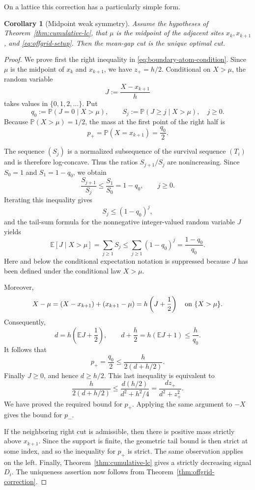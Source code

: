 \documentclass[a4paper]{amsart}
\numberwithin{equation}{section}
\newtheorem{corollary}[theorem]{Corollary}
\theoremstyle{remark}
\newcommand{\E}{\mathbb E}
\newcommand{\Pp}{\mathbb P}
\newcommand{\1}{\mathbf 1}
\begin{document}
On a lattice this correction has a particularly simple form.

\begin{corollary}[Midpoint weak symmetry]\label{cor:midpoint-symmetry}
Assume the hypotheses of Theorem~\ref{thm:cumulative-lc}, that $\mu$ is the
midpoint of the adjacent sites $x_k,x_{k+1}$, and
\eqref{eq:offgrid-setup}.  Then the mean-gap cut is the unique optimal cut.
\end{corollary}

\begin{proof}
We prove first the right inequality in
\eqref{eq:boundary-atom-condition}.  Since $\mu$ is the midpoint of
$x_k$ and $x_{k+1}$, we have $z_+=h/2$.  Conditional on $X>\mu$, the random
variable
\[
 J:=\frac{X-x_{k+1}}{h}
\]
takes values in $\{0,1,2,\ldots\}$.  Put
\[
 q_0:=\Pp(J=0\mid X>\mu),
 \qquad S_j:=\Pp(J\geq j\mid X>\mu),\quad j\geq0.
\]
Because $\Pp(X>\mu)=1/2$, the mass at the first point of the right half is
\[
 p_+=\Pp(X=x_{k+1})=\frac{q_0}{2}.
\]

The sequence $(S_j)$ is a normalized subsequence of the survival sequence
$(T_i)$ and is therefore log-concave.  Thus the ratios
$S_{j+1}/S_j$ are nonincreasing.  Since $S_0=1$ and
$S_1=1-q_0$, we obtain
\[
 \frac{S_{j+1}}{S_j}\leq\frac{S_1}{S_0}=1-q_0,
 \qquad j\geq0.
\]
Iterating this inequality gives
\[
 S_j\leq(1-q_0)^j,
\]
and the tail-sum formula for the nonnegative integer-valued random variable
$J$ yields
\[
 \E[J\mid X>\mu]=\sum_{j\geq1}S_j
 \leq\sum_{j\geq1}(1-q_0)^j
 =\frac{1-q_0}{q_0}.
\]
Here and below the conditional expectation notation is suppressed because
$J$ has been defined under the conditional law $X>\mu$.

Moreover,
\[
 X-\mu=(X-x_{k+1})+(x_{k+1}-\mu)
       =h\left(J+\frac12\right)
 \quad\hbox{on }\{X>\mu\}.
\]
Consequently,
\[
 d=h\left(\E J+\frac12\right),
 \qquad
 d+\frac h2=h(\E J+1)\leq\frac{h}{q_0}.
\]
It follows that
\[
 p_+=\frac{q_0}{2}
 \leq\frac{h}{2(d+h/2)}.
\]
Finally $J\geq0$, and hence $d\geq h/2$.  This last inequality is equivalent
to
\[
 \frac{h}{2(d+h/2)}
 \leq\frac{d(h/2)}{d^2+h^2/4}
 =\frac{dz_+}{d^2+z_+^2}.
\]
We have proved the required bound for $p_+$.  Applying the same argument to
$-X$ gives the bound for $p_-$.

If the neighboring right cut is admissible, then there is positive mass
strictly above $x_{k+1}$.  Since the support is finite, the geometric tail
bound is then strict at some index, and so the inequality for $p_+$ is strict.
The same observation applies on the left.  Finally,
Theorem~\ref{thm:cumulative-lc} gives a strictly decreasing signal $D_i$.
The uniqueness assertion now follows from
Theorem~\ref{thm:offgrid-correction}.
\end{proof}
\end{document}
